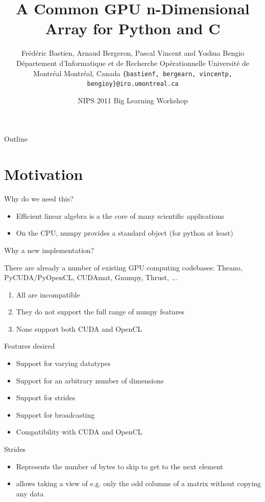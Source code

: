 \documentclass[utf8x,xcolor=pdftex,dvipsnames,table]{beamer}
\title{A Common GPU n-Dimensional Array for Python and C}
\author{
\footnotesize
Frédéric Bastien, Arnaud Bergeron, Pascal Vincent and Yoshua Bengio \newline
Département d'Informatique et de Recherche Opérationnelle \newline
Université de Montréal \newline
Montréal, Canada \newline
\texttt{\{bastienf, bergearn, vincentp, bengioy\}@iro.umontreal.ca}
}
\date{NIPS 2011 Big Learning Workshop}
\begin{document}
\begin{frame}[plain]
 \titlepage
\end{frame}
\addtocounter{framenumber}{-1}

\begin{frame}{Outline}
 \tableofcontents
\end{frame}

\section{Motivation}

\begin{frame}{Why do we need this?}
\begin{itemize}
\item Efficient linear algebra is a the core of many scientific applications
\item On the CPU, numpy provides a standard object (for python at least)
\end{itemize}
\end{frame}

\begin{frame}{Why a new implementation?}
\begin{block}{There are already a number of existing GPU computing codebases:}
Theano, PyCUDA/PyOpenCL, CUDAmat, Gnumpy, Thrust, ...
\end {block}
\begin{enumerate}
\item<2-> All are incompatible
\item<3-> They do not support the full range of numpy features
\item<4-> None support both CUDA and OpenCL
\end{enumerate}
\end{frame}

\begin{frame}{Features desired}
\begin{itemize}
\item Support for varying datatypes
\item Support for an arbitrary number of dimensions
\item Support for strides
\item Support for broadcasting
\item Compatibility with CUDA and OpenCL
\end{itemize}
\end{frame}

\begin{frame}{Strides}
\begin{itemize}
\item Represents the number of bytes to skip to get to the next element
\item allows taking a view of e.g. only the odd columns of a matrix without copying any data
\end{itemize}
\end{frame}
\end{document}
